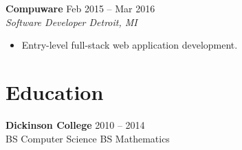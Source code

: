 \documentclass[10pt,letterpaper]{article}
\newcommand{\entry}[4]{%
  {\small\bfseries #1} \hfill {\footnotesize\color{light}#2} \\[-1pt]
  {\footnotesize\itshape #3 \hfill #4} \\[-4pt]
}
\begin{document}
\vspace{2pt}
\entry{Compuware}{Feb 2015 -- Mar 2016}{Software Developer}{Detroit, MI}
\begin{itemize}[nosep]
  \item {\small Entry-level full-stack web application development.}
\end{itemize}

\section*{Education}
{\small\textbf{Dickinson College} \hfill {\color{light}2010 -- 2014}} \\
{\small BS Computer Science \enspace\textbar\enspace BS Mathematics}
\end{document}
